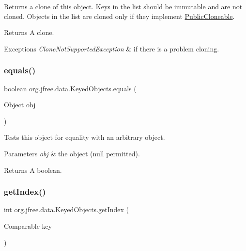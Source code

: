 Returns a clone of this object. Keys in the list should be immutable and are not cloned. Objects in the list are cloned only if they implement \mbox{\hyperlink{}{Public\+Cloneable}}.

\begin{DoxyReturn}{Returns}
A clone.
\end{DoxyReturn}

\begin{DoxyExceptions}{Exceptions}
{\em Clone\+Not\+Supported\+Exception} & if there is a problem cloning. \\
\hline
\end{DoxyExceptions}
\mbox{\label{classorg_1_1jfree_1_1data_1_1_keyed_objects_a53eed765d0a4a6ab604185fd3f4fa749}} 
\subsubsection{\texorpdfstring{equals()}{equals()}}
{\footnotesize\ttfamily boolean org.\+jfree.\+data.\+Keyed\+Objects.\+equals (\begin{DoxyParamCaption}\item[{Object}]{obj }\end{DoxyParamCaption})}

Tests this object for equality with an arbitrary object.


\begin{DoxyParams}{Parameters}
{\em obj} & the object ({\ttfamily null} permitted).\\
\hline
\end{DoxyParams}
\begin{DoxyReturn}{Returns}
A boolean. 
\end{DoxyReturn}
\mbox{\label{classorg_1_1jfree_1_1data_1_1_keyed_objects_af049dbf079bd3469dea36d9b62db3846}} 
\subsubsection{\texorpdfstring{get\+Index()}{getIndex()}}
{\footnotesize\ttfamily int org.\+jfree.\+data.\+Keyed\+Objects.\+get\+Index (\begin{DoxyParamCaption}\item[{Comparable}]{key }\end{DoxyParamCaption})}

